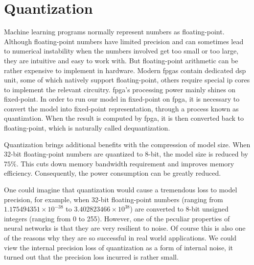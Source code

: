 
\chapter{Quantization}


Machine learning programs normally represent numbers as floating-point. Although floating-point numbers
have limited precision and can sometimes lead to numerical instability when the numbers involved get too
small or too large, they are intuitive and easy to work with. But floating-point arithmetic can be rather
expensive to implement in hardware. Modern \glspl{fpga} contain dedicated \gls{dsp} unit, some of which
natively
support floating-point, others require special \gls{ip} cores to implement the relevant
circuitry. \gls{fpga}'s processing power mainly shines on fixed-point. In order to run our model in fixed-point
on \gls{fpga}, it is necessary to convert the model into fixed-point representation, through a process known as
quantization. When the result is computed by \gls{fpga}, it is then converted back to floating-point, which is
naturally called dequantization.

Quantization brings additional benefits with the compression of model size. When 32-bit floating-point
numbers are quantized to 8-bit, the model size is reduced by $75\%$. This cuts down memory bandwidth
requirement and improves memory efficiency. Consequently, the power consumption can be greatly reduced.

One could imagine that quantization would cause a tremendous loss to model precision, for example, when
32-bit floating-point numbers (ranging from $1.175494351 \times 10^{-38}$ to $3.402823466 \times 10^{38}$)
are converted to
8-bit unsigned integers (ranging from 0 to 255). However, one of the peculiar
properties of neural networks is that they are very resilient to noise. Of course this is also one of the
reasons why they are so successful in real world applications. We could view the internal precision loss of
quantization as a form of internal noise, it turned out that the precision loss incurred is rather small.

